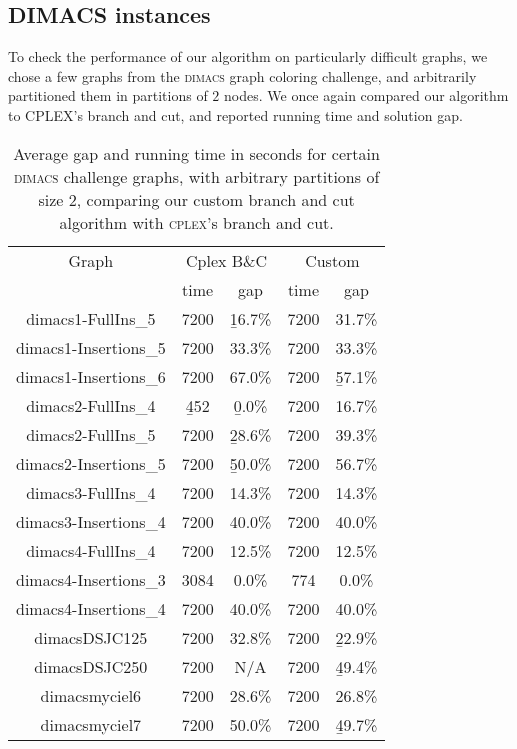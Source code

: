 \subsection{DIMACS instances}

To check the performance of our algorithm on particularly difficult graphs, we chose a few graphs from the \textsc{dimacs} \cite{dimacs} graph coloring challenge, and arbitrarily partitioned them in partitions of $2$ nodes. We once again compared our algorithm to \textsc{CPLEX}'s branch and cut, and reported running time and solution gap.

\begin{table}[h]
\centering
\begin{tabular}{|c|cc|cc|}
\hline
\multicolumn{1}{|c|}{Graph} & \multicolumn{2}{|c|}{Cplex B\&C} & \multicolumn{2}{|c|}{Custom \PCP{}}
\\
 & time & gap & time & gap
\\
\hline
dimacs1-FullIns\_5 & 7200 & \b{16.7\%} & 7200 & 31.7\% 
\\
dimacs1-Insertions\_5 & 7200 & 33.3\% & 7200 & 33.3\% 
\\
dimacs1-Insertions\_6 & 7200 & 67.0\% & 7200 & \b{57.1\%} 
\\
dimacs2-FullIns\_4 & \b{452} & \b{0.0\%} & 7200 & 16.7\%
\\
dimacs2-FullIns\_5 & 7200 & \b{28.6\%} & 7200 & 39.3\%
\\
dimacs2-Insertions\_5 & 7200 & \b{50.0\%} & 7200 & 56.7\%
\\
dimacs3-FullIns\_4 & 7200 & 14.3\% & 7200 & 14.3\%
\\
dimacs3-Insertions\_4 & 7200 & 40.0\% & 7200 & 40.0\%
\\
dimacs4-FullIns\_4 & 7200 & 12.5\% & 7200 & 12.5\%
\\
dimacs4-Insertions\_3 & 3084 & 0.0\% & 774 & 0.0\%
\\
dimacs4-Insertions\_4 & 7200 & 40.0\% & 7200 & 40.0\%
\\
dimacsDSJC125 & 7200 & 32.8\% & 7200 & \b{22.9\%}
\\
dimacsDSJC250 & 7200 & N/A & 7200 & \b{49.4\%}
\\
dimacsmyciel6 & 7200 & 28.6\% & 7200 & 26.8\%
\\
dimacsmyciel7 & 7200 & 50.0\% & 7200 & \b{49.7\%}
\\
\hline 
 \end{tabular} 
\caption{Average gap and running time in seconds for certain \textsc{dimacs} challenge graphs, with arbitrary partitions of size $2$, comparing our custom \PCP{} branch and cut algorithm with \textsc{cplex}'s branch and cut.}
\label{table:final:dimacs}
\end{table}
 
